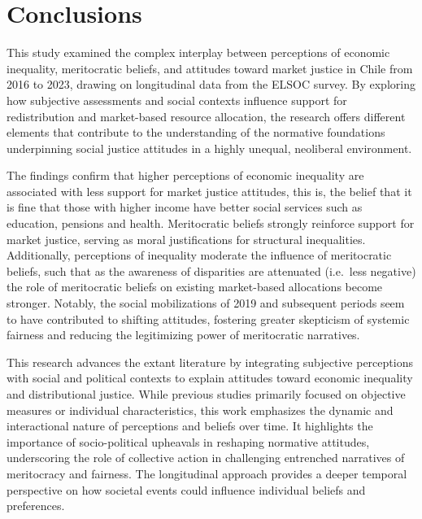\documentclass[
  12pt,
]{article}
\begin{document}
\hypertarget{conclusions}{%
\section{Conclusions}\label{conclusions}}

This study examined the complex interplay between perceptions of
economic inequality, meritocratic beliefs, and attitudes toward market
justice in Chile from 2016 to 2023, drawing on longitudinal data from
the ELSOC survey. By exploring how subjective assessments and social
contexts influence support for redistribution and market-based resource
allocation, the research offers different elements that contribute to
the understanding of the normative foundations underpinning social
justice attitudes in a highly unequal, neoliberal environment.

The findings confirm that higher perceptions of economic inequality are
associated with less support for market justice attitudes, this is, the
belief that it is fine that those with higher income have better social
services such as education, pensions and health. Meritocratic beliefs
strongly reinforce support for market justice, serving as moral
justifications for structural inequalities. Additionally, perceptions of
inequality moderate the influence of meritocratic beliefs, such that as
the awareness of disparities are attenuated (i.e.~less negative) the
role of meritocratic beliefs on existing market-based allocations become
stronger. Notably, the social mobilizations of 2019 and subsequent
periods seem to have contributed to shifting attitudes, fostering
greater skepticism of systemic fairness and reducing the legitimizing
power of meritocratic narratives.

This research advances the extant literature by integrating subjective
perceptions with social and political contexts to explain attitudes
toward economic inequality and distributional justice. While previous
studies primarily focused on objective measures or individual
characteristics, this work emphasizes the dynamic and interactional
nature of perceptions and beliefs over time. It highlights the
importance of socio-political upheavals in reshaping normative
attitudes, underscoring the role of collective action in challenging
entrenched narratives of meritocracy and fairness. The longitudinal
approach provides a deeper temporal perspective on how societal events
could influence individual beliefs and preferences.
\end{document}
